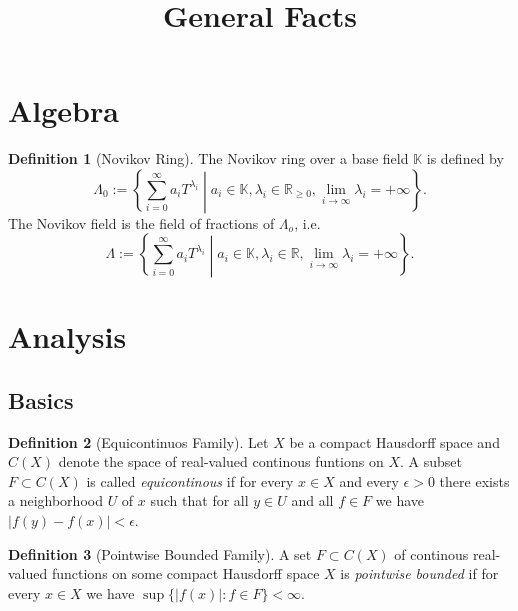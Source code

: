 \documentclass[a4paper]{article}
\title{General Facts}
\newcommand{\RR}{\mathbb{R}}
\newcommand{\KK}{\mathbb{K}}
\theoremstyle{definition}
\theoremstyle{definition}
\newtheorem{definition}{Definition}
\theoremstyle{remark}
\theoremstyle{remark}
\begin{document}
\maketitle 

\tableofcontents

\section{Algebra}

\begin{definition}[Novikov Ring]
  The Novikov ring over a base field $\KK$ is defined by
  \begin{equation*}
    \Lambda_0:=\left\{\sum_{i=0}^{\infty}a_iT^{\lambda_i}\middle|a_i\in\KK,\lambda_i\in\RR_{\geq 0},\lim_{i\to\infty}\lambda_i=+\infty\right\}.
  \end{equation*}
  The Novikov field is the field of fractions of $\Lambda_o$, i.e.\ 
  \begin{equation*}
    \Lambda:=\left\{\sum_{i=0}^{\infty}a_iT^{\lambda_i}\middle|a_i\in\KK,\lambda_i\in\RR,\lim_{i\to\infty}\lambda_i=+\infty\right\}.
  \end{equation*}
\end{definition}

\section{Analysis}

\subsection{Basics}

\begin{definition}[Equicontinuos Family]
  Let $X$ be a compact Hausdorff space and $C(X)$ denote the space of real-valued continous funtions on $X$. A subset $F\subset C(X)$ is called \emph{equicontinous} if for every $x\in X$ and every $\epsilon>0$ there exists a neighborhood $U$ of $x$ such that for all $y\in U$ and all $f\in F$ we have $|f(y)-f(x)|<\epsilon$.
\end{definition}

\begin{definition}[Pointwise Bounded Family]
  A set $F\subset C(X)$ of continous real-valued functions on some compact Hausdorff space $X$ is \emph{pointwise bounded} if for every $x\in X$ we have $\sup\{|f(x)|:f\in F\}<\infty$.
\end{definition}
\end{document}
